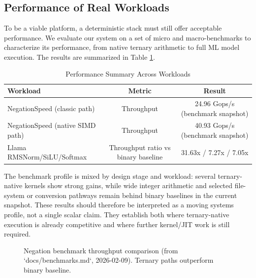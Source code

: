 \documentclass[sigconf, 10pt]{acmart}
\begin{document}
\subsection{Performance of Real Workloads}
To be a viable platform, a deterministic stack must still offer acceptable performance. We evaluate our system on a set of micro and macro-benchmarks to characterize its performance, from native ternary arithmetic to full ML model execution. The results are summarized in Table \ref{tab:perf_summary}.
\begin{table}[h]
\centering
\caption{Performance Summary Across Workloads}
\label{tab:perf_summary}
\begin{tabular}{|l|c|c|}
\hline
\textbf{Workload} & \textbf{Metric} & \textbf{Result} \\
\hline
NegationSpeed (classic path) & Throughput & 24.96 Gops/s (benchmark snapshot) \\
NegationSpeed (native SIMD path) & Throughput & 40.93 Gops/s (benchmark snapshot) \\
Llama RMSNorm/SiLU/Softmax & Throughput ratio vs binary baseline & 31.63x / 7.27x / 7.05x \\
\hline
\end{tabular}
\end{table}
The benchmark profile is mixed by design stage and workload: several ternary-native kernels show strong gains, while wide integer arithmetic and selected file-system or conversion pathways remain behind binary baselines in the current snapshot. These results should therefore be interpreted as a moving systems profile, not a single scalar claim. They establish both where ternary-native execution is already competitive and where further kernel/JIT work is still required.
\begin{figure}[h]
\centering
{}
\caption{Negation benchmark throughput comparison (from `docs/benchmarks.md`, 2026-02-09). Ternary paths outperform binary baseline.}
\label{fig:negation_bench}
\end{figure}
\end{document}
